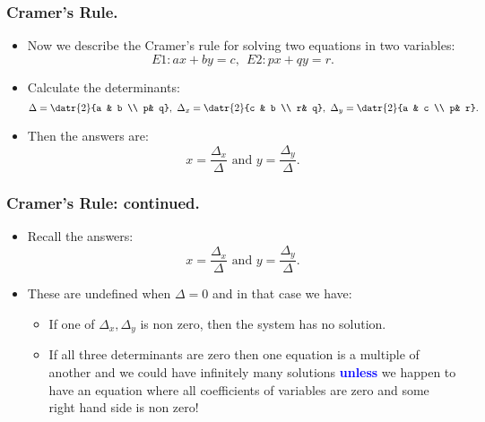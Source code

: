  
\begin{frame}
  \frametitle{Cramer's Rule.}
  \begin{itemize}%
  
 \item Now we describe the Cramer's rule for solving two equations in two variables:
 $$E1: ax+by=c,~~ E2: px+qy=r.$$
 
 
 
 \item Calculate the determinants:
 $$\Delta = \datr{2}{a & b \\ p& q},~ \Delta_x=\datr{2}{c & b \\ r& q},~
 \Delta_y=\datr{2}{a & c \\ p& r}.$$
 
 \item Then the answers are: 
 $$x = \frac{\Delta_x}{\Delta} \mbox{ and } y = \frac{\Delta_y}{\Delta}.$$
 
 
 
 \end{itemize}

\end{frame}

\begin{frame}
  \frametitle{Cramer's Rule: continued.}
  \begin{itemize}%
 
 \item Recall the answers: 
 $$x = \frac{\Delta_x}{\Delta} \mbox{ and } y = \frac{\Delta_y}{\Delta}.$$
 
 \item These are undefined when $\Delta=0$ and in that case we have:
 \begin{itemize}
 \item If one of $\Delta_x,\Delta_y$ is non zero, then the system has no solution.
 \item If all three determinants are zero then one equation is a multiple of another and we could have 
 infinitely many solutions \textcolor{blue}{\bf unless} we happen to have an equation where all coefficients of variables are zero and some right hand side is non zero!
 
 \end{itemize}
 
 
 \end{itemize}

\end{frame}



